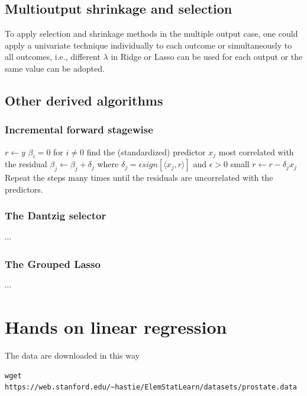 \documentclass[12pt, letterpaper]{article}
\theoremstyle{definition}
\begin{document}
\subsection{Multioutput shrinkage and selection}
To apply selection and shrinkage methods in the multiple output case, one could apply a univariate technique individually to each outcome or simultaneously to all outcomes, i.e., different $\lambda$ in Ridge or Lasso can be used for each output or the same value can be adopted.

\subsection{Other derived algorithms}
\subsubsection{Incremental forward stagewise}
\begin{algorithm}
$r\leftarrow y$ \;
$\beta_i =0$ for $i\ne 0$\;
find the (standardized) predictor $x_j$ most correlated with the residual \;
$\beta_j \leftarrow \beta_j + \delta_j$ where $\delta_j = \epsilon sign\left[\langle x_j, r \rangle\right]$ and $\epsilon >0$ small\;
$r\leftarrow r-\delta_j x_j$\;
Repeat the steps many times until the residuals are uncorrelated with the predictors.
\end{algorithm}

\subsubsection{The Dantzig selector}
$\cdots$

\subsubsection{The Grouped Lasso}
$\cdots$

\newpage

\section{Hands on linear regression}
The data are downloaded in this way 
\begin{lstlisting}
wget https://web.stanford.edu/~hastie/ElemStatLearn/datasets/prostate.data
\end{lstlisting}
\end{document}
